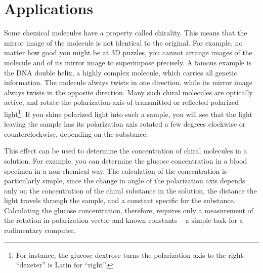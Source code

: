 \section{Applications}
Some chemical molecules have a property called chirality. This means that the mirror image of the molecule is not identical to the original. For example, no matter how good you might be at 3D puzzles, you cannot arrange images of the molecule and of its mirror image to superimpose precisely. A famous example is the DNA double helix, a highly complex molecule, which carries all genetic information. The molecule always twists in one direction, while its mirror image always twists in the opposite direction. Many such chiral molecules are optically active, and rotate the polarization-axis of transmitted or reflected polarized light\footnote{For instance, the glucose dextrose turns the polarization axis to the right: ``dexeter'' is Latin for ``right''.}. If you shine polarized light into such a sample, you will see that the light leaving the sample has its polarization axis rotated a few degrees clockwise or counterclockwise, depending on the substance.\myskip

This effect can be used to determine the concentration of chiral molecules in a solution. For example, you can determine the glucose concentration in a blood specimen in a non-chemical way. The calculation of the concentration is particularly simple, since the change in angle of the polarization axis depends only on the concentration of the chiral substance in the solution, the distance the light travels through the sample, and a constant specific for the substance. Calculating the glucose concentration, therefore, requires only a measurement of the rotation in polarization vector and known constants -- a simple task for a rudimentary computer. 

\newpage
